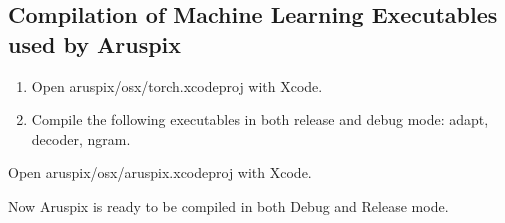 \documentclass[]{article}
\begin{document}
\subsection{Compilation of Machine Learning Executables used by Aruspix}
	\begin{enumerate}
		\item Open aruspix/osx/torch.xcodeproj with Xcode.
		\item Compile the following executables in both release and debug mode: adapt, decoder, ngram.
	\end{enumerate}

Open aruspix/osx/aruspix.xcodeproj with Xcode.

Now Aruspix is ready to be compiled in both Debug and Release mode. 
\end{document}
